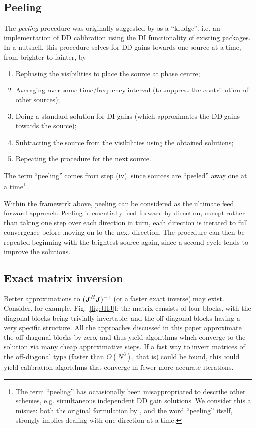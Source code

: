 \documentclass[useAMS,usenatbib]{mn2e}
\newcommand{\mat}[1]{{\bmath{#1}}}
\newcommand{\JJ}{\mat{J}} %
\newcommand{\JHJ}{\JJ^H\JJ} %
\numberwithin{equation}{section}
\begin{document}
\subsection{Peeling}
\label{sec:peeling}

The \emph{peeling} procedure was originally suggested by \citet{JEN:peeling} as a ``kludge'', i.e. an implementation of DD calibration 
using the DI functionality of existing packages. In a nutshell, this procedure solves for DD gains towards one source at a time, from
brighter to fainter, by

\begin{enumerate}
\item Rephasing the visibilities to place the source at phase centre;
\item Averaging over some time/frequency interval (to suppress the contribution of other sources);
\item Doing a standard solution for DI gains (which approximates the DD gains towards the source);
\item Subtracting the source from the visibilities using the obtained solutions;
\item Repeating the procedure for the next source.
\end{enumerate}

The term ``peeling'' comes from step (iv), since sources are ``peeled'' away one at a time\footnote{The term ``peeling'' has 
occasionally been misappropriated to describe other schemes, e.g. simultaneous independent DD gain solutions. We consider this a 
misuse: both the original formulation by \citet{JEN:peeling}, and the word ``peeling'' itself, strongly implies dealing with 
one direction at a time.}.

Within the framework above, peeling can be considered as the ultimate feed forward approach. Peeling is essentially feed-forward by direction, except rather than taking one step over each direction in turn, each direction is iterated to full convergence before moving on to the next direction. The procedure can then be repeated beginning with the brightest source again, since a second cycle tends to improve the solutions. 

\subsection{Exact matrix inversion}

Better approximations to $(\JHJ)^{-1}$ (or a faster exact inverse) may exist. Consider, for example, Fig.~\ref{fig:JHJ}f: 
the matrix consists of four blocks, with the diagonal blocks being trivially invertable, and the off-diagonal blocks having a 
very specific structure. All the approaches discussed in this paper approximate the off-diagonal blocks by zero, and thus 
yield algorithms which converge to the solution via many cheap approximative steps. If a fast way to invert matrices of the 
off-diagonal type (faster than $O(N^3)$, that is) could be found, this could yield calibration algorithms that converge in fewer 
more accurate iterations.
\end{document}
